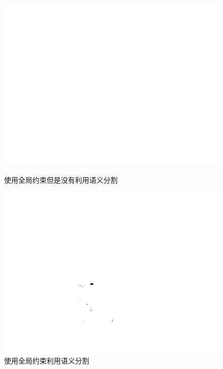 \documentclass[UTF8]{ctexart}
\begin{document}
\begin{sloppypar}
\begin{figure}[htbp]
\begin{minipage}[t]{0.3\linewidth}
                \centering
                \includegraphics[width=0.9\linewidth]{figure/result_colorized_allregion_noseg.png}
                \caption{\small 使用全局约束但是没有利用语义分割}
                \label{fig:colorize:noseg}
            \end{minipage}
            \begin{minipage}[t]{0.3\linewidth}
                \centering
                \includegraphics[width=0.9\linewidth]{figure/result_colorized_allregion_seg.png}
                \caption{\small 使用全局约束利用语义分割}
                \label{fig:colorize:seg}
            \end{minipage}
            \begin{minipage}[t]{0.3\linewidth}
                \centering

\end{minipage}
\end{figure}
\end{sloppypar}
\end{document}
